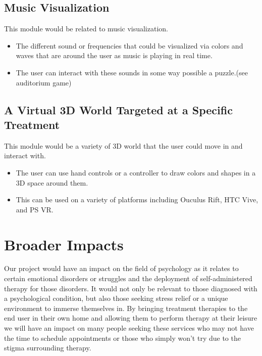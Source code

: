 \documentclass[a4paper,10pt]{article}
\begin{document}
	\subsection{Music Visualization}
	This module would be related to music visualization. 
	\begin{itemize}
		\item The different sound or frequencies that could be visualized via colors and waves that are around the user as music is playing in real time.
		\item The user can interact with these sounds in some way possible a puzzle.(see auditorium game)
	\end{itemize}   
	\subsection{A Virtual 3D World Targeted at a Specific Treatment}
	This module would be a variety of 3D world that the user could move in and interact with. 
	\begin{itemize}
		\item The user can use hand controls or a controller to draw colors and shapes in a 3D space around them. 
		\item This can be used on a variety of platforms including Ouculus Rift, HTC Vive, and PS VR.
	\end{itemize}
	
	\section{Broader Impacts}
	
	
	Our project would have an impact on the field of psychology as it relates to certain emotional disorders or struggles and the deployment of self-administered therapy for those disorders. It would not only be relevant to those diagnosed with a psychological condition, but also those seeking stress relief or a unique environment to immerse themselves in. By bringing treatment therapies to the end user in their own home and allowing them to perform therapy at their leisure we will have an impact on many people seeking these services who may not have the time to schedule appointments or those who simply won't try due to the stigma surrounding therapy.
	
\end{document}
